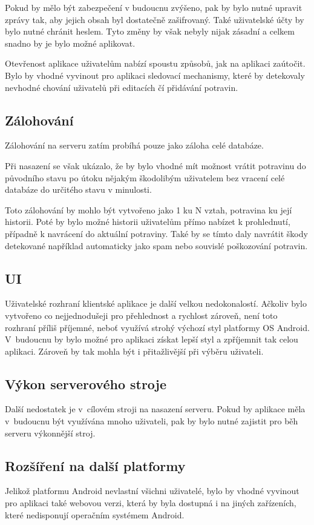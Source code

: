\documentclass[thesis=B,czech]{FITthesis}[2013/10/20]
\begin{document}
\begin{conclusion}
Pokud by mělo být zabezpečení v budoucnu zvýšeno, pak by bylo nutné upravit zprávy tak, aby jejich obsah byl dostatečně zašifrovaný. Také uživatelské účty by bylo nutné chránit heslem. Tyto změny by však nebyly nijak zásadní a celkem snadno by je bylo možné aplikovat.

Otevřenost aplikace uživatelům nabízí spoustu způsobů, jak na aplikaci zaútočit. Bylo by vhodné vyvinout pro aplikaci sledovací mechanismy, které by detekovaly nevhodné chování uživatelů při editacích čí přidávání potravin.

\subsection{Zálohování}
Zálohování na serveru zatím probíhá pouze jako záloha celé databáze.

Při nasazení se však ukázalo, že by bylo vhodné mít možnost vrátit potravinu do původního stavu po útoku nějakým škodolibým uživatelem bez vracení celé databáze do určitého stavu v minulosti.

Toto zálohování by mohlo být vytvořeno jako 1 ku N vztah, potravina ku její historii. Poté by bylo možné historii uživatelům přímo nabízet k prohlednutí, případně k navrácení do aktuální potraviny. Také by se tímto daly navrátit škody detekované například automaticky jako spam nebo souvislé poškozování potravin.

\subsection{UI}
Uživatelské rozhraní klientské aplikace je další velkou nedokonalostí. Ačkoliv bylo vytvořeno co nejjednodušeji pro přehlednost a rychlost zároveň, není toto rozhraní příliš příjemné, neboť využívá strohý výchozí styl platformy OS Android. V~budoucnu by bylo možné pro aplikaci získat lepší styl a zpříjemnit tak celou aplikaci. Zároveň by tak mohla být i přitažlivější při výběru uživateli.

\subsection{Výkon serverového stroje}
Další nedostatek je v~cílovém stroji na nasazení serveru. Pokud by aplikace měla v~budoucnu být využívána mnoho uživateli, pak by bylo nutné zajistit pro běh serveru výkonnější stroj.

\subsection{Rozšíření na další platformy}
Jelikož platformu Android nevlastní všichni uživatelé, bylo by vhodné vyvinout pro aplikaci také webovou verzi, která by byla dostupná i na jiných zařízeních, které nedisponují operačním systémem Android.

\end{conclusion}
\end{document}
